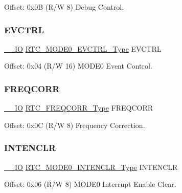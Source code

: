 Offset\+: 0x0B (R/W 8) Debug Control. 

\mbox{\label{struct_rtc_mode0_adc4a1ceb5a68b2bf1778d6c2cb99adc7}} 
\subsubsection{\texorpdfstring{EVCTRL}{EVCTRL}}
{\footnotesize\ttfamily \mbox{\hyperlink{core__cm0plus_8h_aec43007d9998a0a0e01faede4133d6be}{\+\_\+\+\_\+\+IO}} \mbox{\hyperlink{union_r_t_c___m_o_d_e0___e_v_c_t_r_l___type}{R\+T\+C\+\_\+\+M\+O\+D\+E0\+\_\+\+E\+V\+C\+T\+R\+L\+\_\+\+Type}} E\+V\+C\+T\+RL}



Offset\+: 0x04 (R/W 16) M\+O\+D\+E0 Event Control. 

\mbox{\label{struct_rtc_mode0_a6895b43aadf5f05e11817146109d789a}} 
\subsubsection{\texorpdfstring{FREQCORR}{FREQCORR}}
{\footnotesize\ttfamily \mbox{\hyperlink{core__cm0plus_8h_aec43007d9998a0a0e01faede4133d6be}{\+\_\+\+\_\+\+IO}} \mbox{\hyperlink{union_r_t_c___f_r_e_q_c_o_r_r___type}{R\+T\+C\+\_\+\+F\+R\+E\+Q\+C\+O\+R\+R\+\_\+\+Type}} F\+R\+E\+Q\+C\+O\+RR}



Offset\+: 0x0C (R/W 8) Frequency Correction. 

\mbox{\label{struct_rtc_mode0_a89da856a2232099114f86ede79482a42}} 
\subsubsection{\texorpdfstring{INTENCLR}{INTENCLR}}
{\footnotesize\ttfamily \mbox{\hyperlink{core__cm0plus_8h_aec43007d9998a0a0e01faede4133d6be}{\+\_\+\+\_\+\+IO}} \mbox{\hyperlink{union_r_t_c___m_o_d_e0___i_n_t_e_n_c_l_r___type}{R\+T\+C\+\_\+\+M\+O\+D\+E0\+\_\+\+I\+N\+T\+E\+N\+C\+L\+R\+\_\+\+Type}} I\+N\+T\+E\+N\+C\+LR}



Offset\+: 0x06 (R/W 8) M\+O\+D\+E0 Interrupt Enable Clear. 

